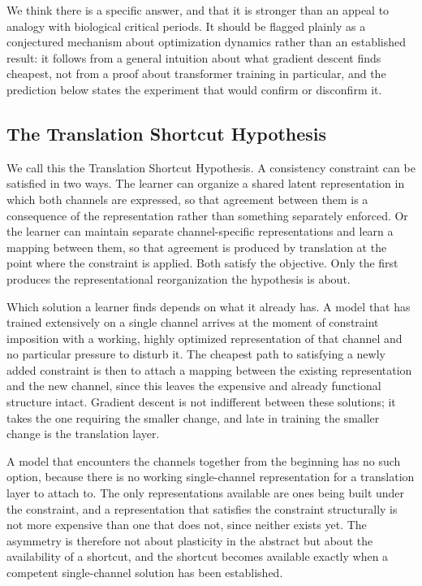 \documentclass[11pt]{article}
\begin{document}
We think there is a specific answer, and that it is stronger than an appeal to analogy with biological critical periods. It should be flagged plainly as a conjectured mechanism about optimization dynamics rather than an established result: it follows from a general intuition about what gradient descent finds cheapest, not from a proof about transformer training in particular, and the prediction below states the experiment that would confirm or disconfirm it.

\subsection{The Translation Shortcut Hypothesis}

We call this the Translation Shortcut Hypothesis. A consistency constraint can be satisfied in two ways. The learner can organize a shared latent representation in which both channels are expressed, so that agreement between them is a consequence of the representation rather than something separately enforced. Or the learner can maintain separate channel-specific representations and learn a mapping between them, so that agreement is produced by translation at the point where the constraint is applied. Both satisfy the objective. Only the first produces the representational reorganization the hypothesis is about.

Which solution a learner finds depends on what it already has. A model that has trained extensively on a single channel arrives at the moment of constraint imposition with a working, highly optimized representation of that channel and no particular pressure to disturb it. The cheapest path to satisfying a newly added constraint is then to attach a mapping between the existing representation and the new channel, since this leaves the expensive and already functional structure intact. Gradient descent is not indifferent between these solutions; it takes the one requiring the smaller change, and late in training the smaller change is the translation layer.

A model that encounters the channels together from the beginning has no such option, because there is no working single-channel representation for a translation layer to attach to. The only representations available are ones being built under the constraint, and a representation that satisfies the constraint structurally is not more expensive than one that does not, since neither exists yet. The asymmetry is therefore not about plasticity in the abstract but about the availability of a shortcut, and the shortcut becomes available exactly when a competent single-channel solution has been established.
\end{document}
